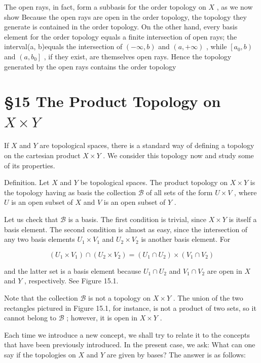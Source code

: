 The open rays, in fact, form a subbasis for the order topology on \(X\) , as we now show Because the open rays are open in the order topology, the topology they generate is contained in the order topology. On the other hand, every basis element for the order topology equals a finite intersection of open rays; the interval(a, b)equals the intersection of \(\left( {-\infty ,b}\right)\) and \(\left( {a, + \infty }\right)\) , while \(\left\lbrack  {{a}_{0},b}\right)\) and \(\left( {a,{b}_{0}}\right\rbrack\) , if they exist, are themselves open rays. Hence the topology generated by the open rays contains the order topology

\section*{§15 The Product Topology on \(X \times  Y\)}

If \(X\) and \(Y\) are topological spaces, there is a standard way of defining a topology on the cartesian product \(X \times  Y\) . We consider this topology now and study some of its properties.

Definition. Let \(X\) and \(Y\) be topological spaces. The product topology on \(X \times  Y\) is the topology having as basis the collection \(\mathcal{B}\) of all sets of the form \(U \times  V\) , where \(U\) is an open subset of \(X\) and \(V\) is an open subset of \(Y\) .

Let us check that \(\mathcal{B}\) is a basis. The first condition is trivial, since \(X \times  Y\) is itself a basis element. The second condition is almost as easy, since the intersection of any two basis elements \({U}_{1} \times  {V}_{1}\) and \({U}_{2} \times  {V}_{2}\) is another basis element. For

\[
\left( {{U}_{1} \times  {V}_{1}}\right)  \cap  \left( {{U}_{2} \times  {V}_{2}}\right)  = \left( {{U}_{1} \cap  {U}_{2}}\right)  \times  \left( {{V}_{1} \cap  {V}_{2}}\right)
\]

and the latter set is a basis element because \({U}_{1} \cap  {U}_{2}\) and \({V}_{1} \cap  {V}_{2}\) are open in \(X\) and \(Y\) , respectively. See Figure 15.1.

Note that the collection \(\mathcal{B}\) is not a topology on \(X \times  Y\) . The union of the two rectangles pictured in Figure 15.1, for instance, is not a product of two sets, so it cannot belong to \(\mathcal{B}\) ; however, it is open in \(X \times  Y\) .

Each time we introduce a new concept, we shall try to relate it to the concepts that have been previously introduced. In the present case, we ask: What can one say if the topologies on \(X\) and \(Y\) are given by bases? The answer is as follows:

